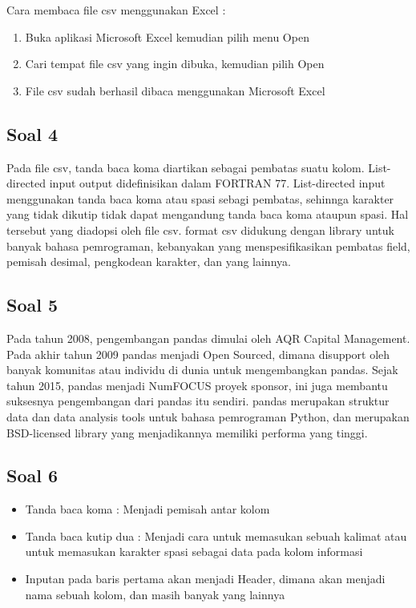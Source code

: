 	Cara membaca file csv menggunakan Excel :
		\begin{enumerate}
			\item Buka aplikasi Microsoft Excel kemudian pilih menu Open
			\item Cari tempat file csv yang ingin dibuka, kemudian pilih Open
			\item File csv sudah berhasil dibaca menggunakan Microsoft Excel
		\end{enumerate}	
				
	\subsection{Soal 4}
	Pada file csv, tanda baca koma diartikan sebagai pembatas suatu kolom. List-directed input output didefinisikan dalam FORTRAN 77. List-directed input menggunakan tanda baca koma atau spasi sebagi pembatas, sehinnga karakter yang tidak dikutip tidak dapat mengandung tanda baca koma ataupun spasi. Hal tersebut yang diadopsi oleh file csv. format csv didukung dengan library untuk banyak bahasa pemrograman, kebanyakan yang menspesifikasikan pembatas field, pemisah desimal, pengkodean karakter, dan yang lainnya.
	
	\subsection{Soal 5}
	Pada tahun 2008, pengembangan pandas dimulai oleh AQR Capital Management. Pada akhir tahun 2009 pandas menjadi Open Sourced, dimana disupport oleh banyak komunitas atau individu di dunia untuk mengembangkan pandas. Sejak tahun 2015, pandas menjadi NumFOCUS proyek sponsor, ini juga membantu suksesnya pengembangan dari pandas itu sendiri. pandas merupakan struktur data dan data analysis tools untuk bahasa pemrograman Python, dan merupakan BSD-licensed library yang menjadikannya memiliki performa yang tinggi.
	
	\subsection{Soal 6}
		\begin {itemize} 
			\item Tanda baca koma : Menjadi pemisah antar kolom
			\item Tanda baca kutip dua : Menjadi cara untuk memasukan sebuah kalimat atau untuk memasukan karakter spasi sebagai data pada kolom informasi
			\item Inputan pada baris pertama akan menjadi Header, dimana akan menjadi nama sebuah kolom, dan masih banyak yang lainnya
		\end{itemize}
	
